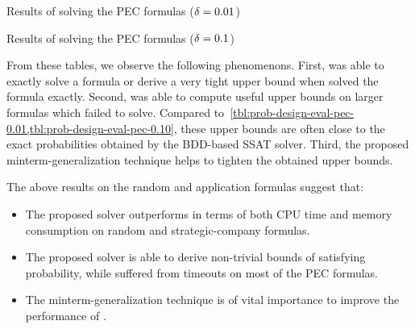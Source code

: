 \begin{table}[ht]
    \centering
    \scriptsize
    \caption{Results of solving the PEC formulas ($\delta=0.01$)}
    \label{tbl:random-exist-ssat-pec-0.01}
\end{table}

\begin{table}[ht]
    \centering
    \scriptsize
    \caption{Results of solving the PEC formulas ($\delta=0.1$)}
    \label{tbl:random-exist-ssat-pec-0.10}
\end{table}

From these tables, we observe the following phenomenons.
First, \ressat was able to exactly solve a formula or derive a very tight upper bound
when \dcssat solved the formula exactly.
Second, \ressat was able to compute useful upper bounds on larger formulas which \dcssat failed to solve.
Compared to~\cref{tbl:prob-design-eval-pec-0.01,tbl:prob-design-eval-pec-0.10},
these upper bounds are often close to the exact probabilities obtained by the BDD-based SSAT solver.
Third, the proposed minterm-generalization technique helps to tighten the obtained upper bounds.

The above results on the random and application formulas suggest that:
\begin{itemize}
    \item The proposed solver \ressat outperforms \dcssat in terms of both CPU time and memory consumption on random and strategic-company formulas.
    \item The proposed solver \ressat is able to derive non-trivial bounds of satisfying probability,
          while \dcssat suffered from timeouts on most of the PEC formulas.
    \item The minterm-generalization technique is of vital importance to improve the performance of \ressat.
\end{itemize}